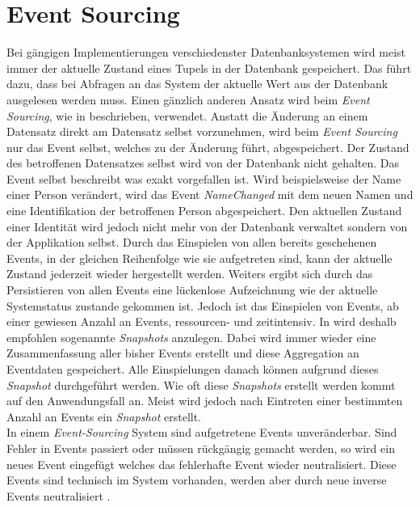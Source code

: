 \section{Event Sourcing}
\label{sec:eventSourcing}
Bei gängigen Implementierungen verschiedenster Datenbanksystemen wird meist immer der aktuelle Zustand eines Tupels in der Datenbank gespeichert. Das führt dazu, dass bei Abfragen an das System der aktuelle Wert aus der Datenbank ausgelesen werden muss. Einen gänzlich anderen Ansatz wird beim \textit{Event Sourcing}, wie in \cite{vernon2013implementing} beschrieben, verwendet. Anstatt die Änderung an einem Datensatz direkt am Datensatz selbst vorzunehmen, wird beim \textit{Event Sourcing} nur das Event selbst, welches zu der Änderung führt, abgespeichert. Der Zustand des betroffenen Datensatzes selbst wird von der Datenbank nicht gehalten. Das Event selbst beschreibt was exakt vorgefallen ist. Wird beispielsweise der Name einer Person verändert, wird das Event \textit{NameChanged} mit dem neuen Namen und eine Identifikation der betroffenen Person abgespeichert. Den aktuellen Zustand einer Identität wird jedoch nicht mehr von der Datenbank verwaltet sondern von der Applikation selbst. Durch das Einspielen von allen bereits geschehenen Events, in der gleichen Reihenfolge wie sie aufgetreten sind, kann der aktuelle Zustand jederzeit wieder hergestellt werden. Weiters ergibt sich durch das Persistieren von allen Events eine lückenlose Aufzeichnung wie der aktuelle Systemstatus zustande gekommen ist. 
Jedoch ist das Einspielen von Events, ab einer gewiesen Anzahl an Events, ressourcen- und zeitintensiv. In \cite{vernon2013implementing} wird deshalb empfohlen sogenannte \textit{Snapshots} anzulegen. Dabei wird immer wieder eine Zusammenfassung aller bisher Events erstellt und diese Aggregation an Eventdaten gespeichert. Alle Einspielungen danach können aufgrund dieses \textit{Snapshot} durchgeführt werden. Wie oft diese \textit{Snapshots} erstellt werden kommt auf den Anwendungsfall an. Meist wird jedoch nach Eintreten einer bestimmten Anzahl an Events ein \textit{Snapshot} erstellt. \\
In einem \textit{Event-Sourcing} System sind aufgetretene Events unveränderbar. Sind Fehler in Events passiert oder müssen rückgängig gemacht werden, so wird ein neues Event eingefügt welches das fehlerhafte Event wieder neutralisiert. Diese Events sind technisch im System vorhanden, werden aber durch neue inverse Events neutralisiert \citep{vernon2013implementing}.
